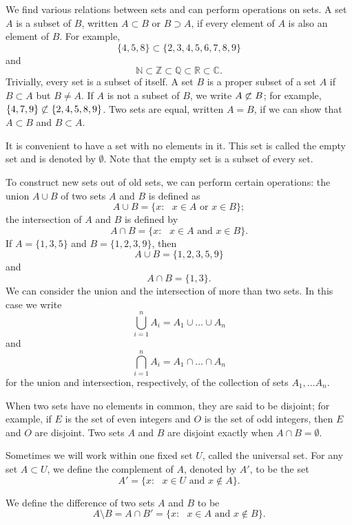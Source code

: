 We find various relations between sets and can perform operations on sets.  A set $A$ is a {\bfi subset\/} of $B$, written $A \subset B$\label{sets_contain} or $B \supset A$, if every element of $A$ is also an element of $B$.  For example,  
$$
\{4,5,8\} \subset \{2, 3, 4, 5, 6, 7, 8, 9 \}
$$
and
$$
{\mathbb N} \subset {\mathbb Z} \subset {\mathbb Q} \subset {\mathbb R} \subset {\mathbb C}.
$$
Trivially, every set is a subset of itself.  A set $B$ is a {\bfi proper subset\/} of a set $A$ if $B \subset A$ but $B \neq A$. If $A$ is not a subset of $B$, we write $A \not\subset B$; for example, $\{4, 7, 9\} \not\subset \{2, 4, 5,  8, 9 \}$.  Two sets are {\bfi equal}, written $A = B$, if we can show that $A \subset B$ and $B \subset A$.  

It is convenient to have a set with no elements in it.  This set is called the {\bfi empty set\/} and is denoted by $\emptyset$\label{sets_emptyset}.  Note that the empty set is a subset of every set.  

To construct new sets out of old sets, we can perform certain operations: the {\bfi union\/} $A \cup B$ of two sets $A$ and $B$ is defined as  
$$
A \cup B\label{sets_union} = \{x : \mbox{ $x \in A$ or $x \in B$} \};
$$
the {\bfi intersection\/} of $A$ and $B$  is defined by
$$
A \cap B\label{sets_intersection} = \{x : \mbox{ $x \in A$ and $x \in B$} \}.
$$
If $A = \{1, 3, 5\}$ and $B = \{ 1, 2, 3, 9 \}$, then
$$
A \cup B = \{1, 2, 3, 5, 9 \}
$$
and
$$
A \cap B = \{ 1, 3 \}.
$$
We can consider the union and the intersection of more than two sets.  In this case we write 
$$
\bigcup_{i = 1}^{n} A_{i} = A_{1} \cup \ldots \cup A_n
$$
and
$$
\bigcap_{i = 1}^{n} A_{i} = A_{1} \cap \ldots \cap A_n
$$
for the union and intersection, respectively, of the collection of sets $A_1, \ldots A_n$.

When two sets have no elements in common, they are said to be {\bfi disjoint}; for example, if $E$ is the set of even integers and $O$ is the set of odd integers, then $E$ and $O$ are disjoint.  Two sets $A$ and $B$ are disjoint exactly when $A \cap B = \emptyset$. 

Sometimes we will work within one fixed set $U$, called the {\bfi universal set}.  For any set $A \subset U$, we define the {\bfi complement\/} of $A$, denoted by $A'$\label{sets_complement}, to be the set 
$$
A' = \{ x : \mbox{ $x \in U$ and $x \notin A$} \}.
$$

We define the {\bfi difference\/} of two sets $A$ and $B$ to be
$$
A \setminus B\label{sets_difference} = A \cap B'  = \{ x : \mbox{ $x \in A$ and $x \notin B$} \}.
$$

